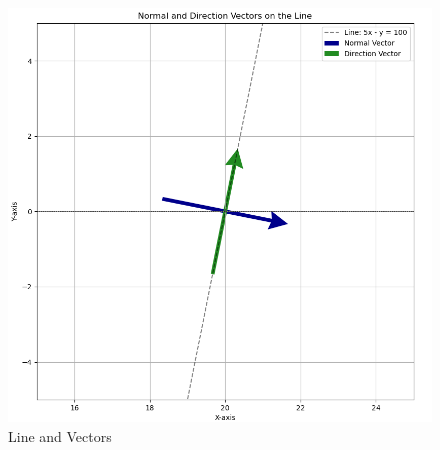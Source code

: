 \documentclass[journal]{IEEEtran}
\begin{document}
\begin{figure}[h!]
    \centering
    \includegraphics[width=0.7\columnwidth]{figs/Figure_1.png}
    \caption{Line and Vectors}
    \label{4-4.2-2-fig-0}
\end{figure}
\end{document}

